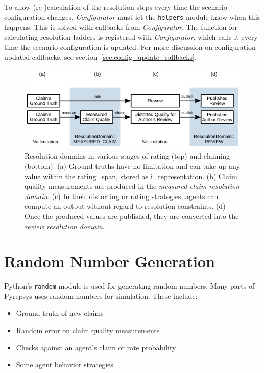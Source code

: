 \documentclass[%
    ]{\PathToTumTemplate/thesis/tum_thesis}
\begin{document}
To allow (re-)calculation of the resolution steps every time the scenario configuration changes, \emph{Configurator} must let the \lstinline{helpers} module know when this happens.
This is solved with callbacks from \emph{Configurator}.
The function for calculating resolution ladders is registered with \emph{Configurator}, which calls it every time the scenario configuration is updated.
For more discussion on configuration updated callbacks, see section~\ref{sec:config_update_callbacks}.

\begin{figure}[tbp]
  \begin{center}
        \includegraphics[width=1\linewidth]	{../images/resolution_domains-crop.pdf}
    \caption{
    Resolution domains in various stages of rating (top) and claiming (bottom).
    (a) Ground truths have no limitation and can take up any value within the \gls{rating_span}, stored as \gls{i_representation}.
    (b) Claim quality measurements are produced in the \emph{measured claim resolution domain}.
    (c) In their distorting or rating strategies, agents can compute an output without regard to resolution constraints.
    (d) Once the produced values are published, they are converted into the \emph{review resolution domain}.
    }
    \label{fig:resolution_domains}
  \end{center}
\end{figure}



\section{Random Number Generation}\label{sec:impl_rng}

Python's \lstinline{random} module is used for generating random numbers.
Many parts of Pyrepsys uses random numbers for simulation.
These include:
\begin{itemize}
	\item Ground truth of new claims
	\item Random error on claim quality measurements
	\item Checks against an agent's claim or rate probability
	\item Some agent behavior strategies
\end{itemize}
\end{document}
